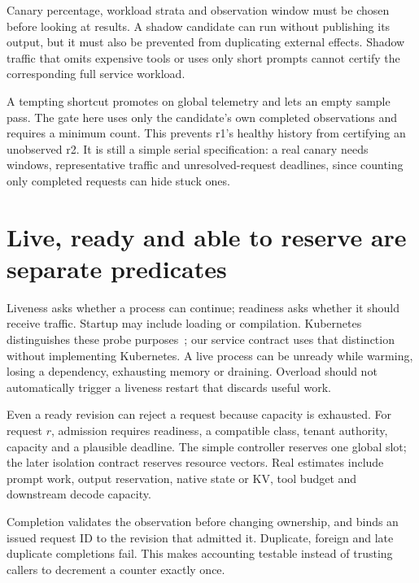 
Canary percentage, workload strata and observation window must be chosen
before looking at results. A shadow candidate can run without publishing its
output, but it must also be prevented from duplicating external effects.
Shadow traffic that omits expensive tools or uses only short prompts cannot
certify the corresponding full service workload.

A tempting shortcut promotes on global telemetry and lets an empty sample pass.
The gate here uses only the candidate's own completed observations and requires a
minimum count. This prevents r1's healthy history
from certifying an unobserved r2. It is still a simple serial specification:
a real canary needs windows, representative traffic and unresolved-request
deadlines, since counting only completed requests can hide stuck ones.

\section{Live, ready and able to reserve are separate predicates}
\label{evod44:admit}
Liveness asks whether a process can continue; readiness asks whether it should
receive traffic. Startup may include loading or compilation. Kubernetes
distinguishes these probe purposes~\cite{probes44}; our service contract uses
that distinction without implementing Kubernetes. A live process can be unready
while warming, losing a dependency, exhausting memory or draining. Overload
should not automatically trigger a liveness restart that discards useful work.

Even a ready revision can reject a request because capacity is exhausted.
For request $r$, admission requires readiness, a compatible class, tenant
authority, capacity and a plausible deadline. The simple controller reserves
one global slot; the later isolation contract reserves resource vectors.
Real estimates include prompt work, output reservation, native state or KV,
tool budget and downstream decode capacity.


Completion validates the observation before changing ownership, and binds an
issued request ID to the revision that admitted it. Duplicate, foreign and
late duplicate completions fail. This makes accounting testable instead of
trusting callers to decrement a counter exactly once.

